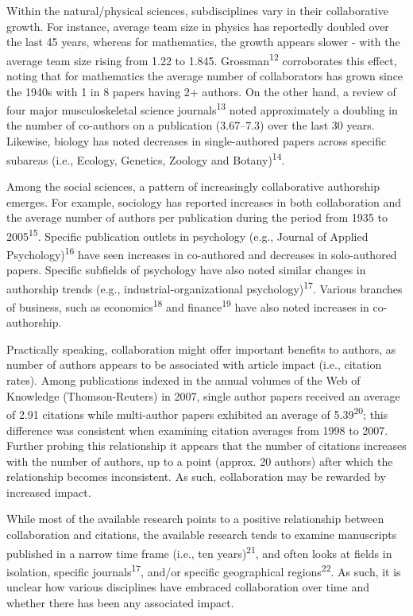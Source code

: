 \documentclass[
  man,floatsintext]{apa6}
\begin{document}
Within the natural/physical sciences, subdisciplines vary in their collaborative growth. For instance, average team size in physics has reportedly doubled over the last 45 years, whereas for mathematics, the growth appears slower - with the average team size rising from 1.22 to 1.845. Grossman\textsuperscript{12} corroborates this effect, noting that for mathematics the average number of collaborators has grown since the 1940s with 1 in 8 papers having 2+ authors. On the other hand, a review of four major musculoskeletal science journals\textsuperscript{13} noted approximately a doubling in the number of co-authors on a publication (3.67--7.3) over the last 30 years. Likewise, biology has noted decreases in single-authored papers across specific subareas (i.e., Ecology, Genetics, Zoology and Botany)\textsuperscript{14}.

Among the social sciences, a pattern of increasingly collaborative authorship emerges. For example, sociology has reported increases in both collaboration and the average number of authors per publication during the period from 1935 to 2005\textsuperscript{15}. Specific publication outlets in psychology (e.g., Journal of Applied Psychology)\textsuperscript{16} have seen increases in co-authored and decreases in solo-authored papers. Specific subfields of psychology have also noted similar changes in authorship trends (e.g., industrial-organizational psychology)\textsuperscript{17}. Various branches of business, such as economics\textsuperscript{18} and finance\textsuperscript{19} have also noted increases in co-authorship.

Practically speaking, collaboration might offer important benefits to authors, as number of authors appears to be associated with article impact (i.e., citation rates). Among publications indexed in the annual volumes of the Web of Knowledge (Thomson-Reuters) in 2007, single author papers received an average of 2.91 citations while multi-author papers exhibited an average of 5.39\textsuperscript{20}; this difference was consistent when examining citation averages from 1998 to 2007. Further probing this relationship it appears that the number of citations increases with the number of authors, up to a point (approx. 20 authors) after which the relationship becomes inconsistent. As such, collaboration may be rewarded by increased impact.

While most of the available research points to a positive relationship between collaboration and citations, the available research tends to examine manuscripts published in a narrow time frame (i.e., ten years)\textsuperscript{21}, and often looks at fields in isolation, specific journals\textsuperscript{17}, and/or specific geographical regions\textsuperscript{22}. As such, it is unclear how various disciplines have embraced collaboration over time and whether there has been any associated impact.
\end{document}
